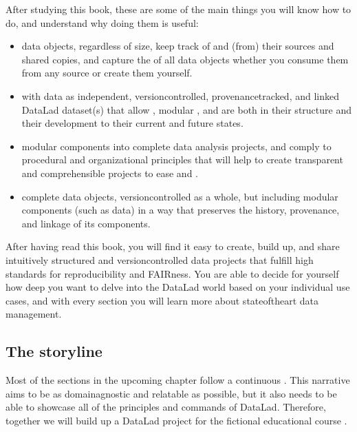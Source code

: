 \sphinxAtStartPar
After studying this book, these are some of the main
things you will know how to do, and understand why doing them is useful:
\begin{itemize}
\item {} 
\sphinxAtStartPar
{} data objects, regardless of size, keep track of
and  (from) their sources and shared copies, and capture the
 of all data objects whether you consume them from any source
or create them yourself.

\item {} 
\sphinxAtStartPar
{} with data as independent, version\sphinxhyphen{}controlled,
provenance\sphinxhyphen{}tracked, and linked DataLad dataset(s) that allow ,
modular , and are  both in their structure and their
development to their current and future states.

\item {} 
\sphinxAtStartPar
{} modular components into complete data analysis projects, and comply
to procedural and organizational principles that will help to create transparent
and comprehensible projects to ease  and .

\item {} 
\sphinxAtStartPar
{} complete data objects, version\sphinxhyphen{}controlled as a whole, but including
modular components (such as data) in a way that preserves the history,
provenance, and linkage of its components.

\end{itemize}

\sphinxAtStartPar
After having read this book, you will find it easy to create, build up, and
share intuitively structured and version\sphinxhyphen{}controlled data projects that
fulfill high standards for reproducibility and FAIRness. You are able to
decide for yourself how deep you want to delve into the DataLad world
based on your individual use cases, and with every section you will learn
more about state\sphinxhyphen{}of\sphinxhyphen{}the\sphinxhyphen{}art data management.


\subsection{The storyline}
\label{\detokenize{intro/narrative:the-storyline}}
\sphinxAtStartPar
Most of the sections in the upcoming chapter follow a continuous .
This narrative aims to be as domain\sphinxhyphen{}agnostic and relatable as possible, but
it also needs to be able to showcase all of the principles and commands
of DataLad. Therefore, together we will build up a DataLad project for the
fictional educational course .

